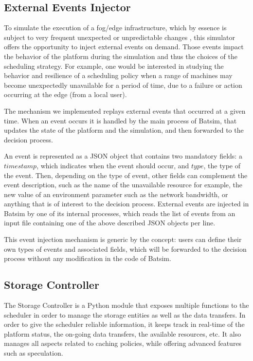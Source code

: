 \subsection{External Events Injector}
\label{sssec:external-events}

To simulate the execution of a fog/edge infrastructure, which by essence is subject to very frequent unexpected or unpredictable changes%
, this simulator offers the opportunity to inject external events on demand. Those events impact the behavior of the platform during the simulation and thus the choices of the scheduling strategy. For example, one would be interested in studying the behavior and resilience of a scheduling policy when a range of machines may become unexpectedly unavailable for a period of time, due to a failure or action occurring at the edge (\eg from a local user).

The mechanism we implemented replays external events that occurred at a given time.
When an event occurs it is handled by the main process of Batsim, that updates the state of the platform and the simulation, and then forwarded to the decision process.

An event is represented as a JSON object that contains two mandatory fields: a $timestamp$, which indicates when the event should occur, and $type$, the type of the event.
Then, depending on the type of event, other fields can complement the event description, such as the name of the unavailable resource for example, the new value of an environment parameter such as the network bandwidth, or anything that is of interest to the decision process.
External events are injected in Batsim by one of its internal processes, which reads the list of events from an input file containing one of the above described JSON objects per line.

This event injection mechanism is generic by the concept: users can define their own types of events and associated fields, which will be forwarded to the decision process without any modification in the code of Batsim.

\subsection{Storage Controller}
The Storage Controller is a Python module that exposes multiple functions to the scheduler in order to manage the storage entities as well as the data transfers.
In order to give the scheduler reliable information, it keeps track in real-time of the platform status, \ie the on-going data transfers, the available resources, etc.
It also manages all aspects related to caching policies, while offering advanced features such as speculation.
